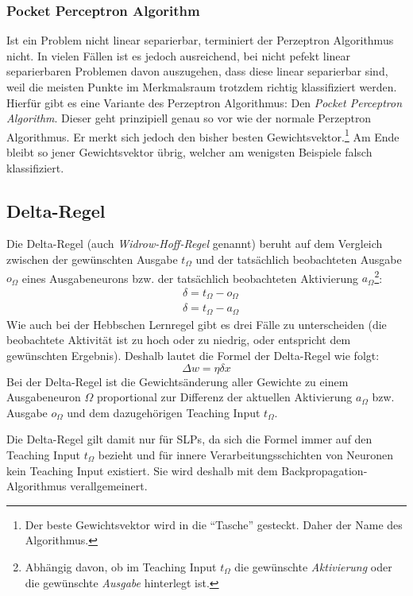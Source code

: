 \subsubsection*{Pocket Perceptron Algorithm}
Ist ein Problem nicht linear separierbar, terminiert der Perzeptron Algorithmus nicht. In vielen Fällen ist es jedoch ausreichend, bei nicht pefekt linear separierbaren Problemen davon auszugehen, dass diese linear separierbar sind, weil die meisten Punkte im Merkmalsraum trotzdem richtig klassifiziert werden.
Hierfür gibt es eine Variante des Perzeptron Algorithmus: Den \emph{Pocket Perceptron Algorithm}. Dieser geht prinzipiell genau so vor wie der normale Perzeptron Algorithmus. Er merkt sich jedoch den bisher besten Gewichtsvektor.\footnote{Der beste Gewichtsvektor wird in die "`Tasche"' gesteckt. Daher der Name des Algorithmus.} Am Ende bleibt so jener Gewichtsvektor übrig, welcher am wenigsten Beispiele falsch klassifiziert.

\subsection*{Delta-Regel}
Die Delta-Regel (auch \emph{Widrow-Hoff-Regel} genannt) beruht auf dem Vergleich zwischen der gewünschten Ausgabe $t_{\Omega}$ und der tatsächlich beobachteten Ausgabe $o_{\Omega}$ eines Ausgabeneurons bzw. der tatsächlich beobachteten Aktivierung $a_{\Omega}$\footnote{Abhängig davon, ob im Teaching Input $t_{\Omega}$ die gewünschte \emph{Aktivierung} oder die gewünschte \emph{Ausgabe} hinterlegt ist.}:
\begin{align*}
	&\delta = t_{\Omega} - o_{\Omega} \\
	&\delta = t_{\Omega} - a_{\Omega}
\end{align*}
Wie auch bei der Hebbschen Lernregel gibt es drei Fälle zu unterscheiden (die beobachtete Aktivität ist zu hoch oder zu niedrig, oder entspricht dem gewünschten Ergebnis). Deshalb lautet die Formel der Delta-Regel wie folgt:
\[
	\Delta w = \eta \delta x
\]
Bei der Delta-Regel ist die Gewichtsänderung aller Gewichte zu einem Ausgabeneuron $\Omega$ proportional zur Differenz der aktuellen Aktivierung $a_{\Omega}$ bzw. Ausgabe $o_{\Omega}$ und dem dazugehörigen Teaching Input $t_{\Omega}$.  

Die Delta-Regel gilt damit nur für SLPs, da sich die Formel immer auf den Teaching Input $t_{\Omega}$ bezieht und für innere Verarbeitungsschichten von Neuronen kein Teaching Input existiert. Sie wird deshalb mit dem Backpropagation-Algorithmus verallgemeinert.


